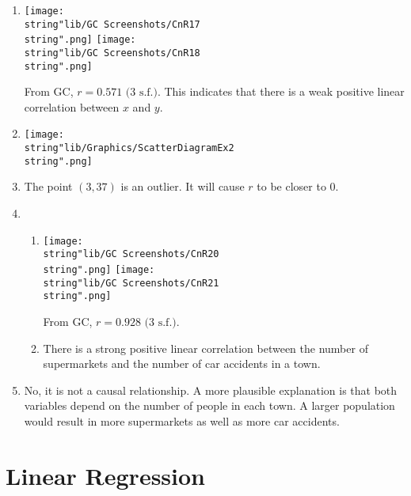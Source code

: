 \documentclass[11pt,a4paper]{book}
\begin{document}
\begin{example}
\Solution

\begin{enumerate}[label=(\alph*)]

\item  \texttt{[image: \\string"lib/GC Screenshots/CnR17\\string".png]}
\hspace{1cm}\texttt{[image: \\string"lib/GC Screenshots/CnR18\\string".png]}

From GC, $r=0.571\text{ (3 s.f.)}$. This indicates that there is
a weak positive linear correlation between $x$ and $y$.

\item  \texttt{[image: \\string"lib/Graphics/ScatterDiagramEx2\\string".png]}

\item  The point $\left(3,37\right)$ is an outlier. It will cause
$r$ to be closer to $0$.

\item  \begin{enumerate}[label=(\roman*)]

\item  \texttt{[image: \\string"lib/GC Screenshots/CnR20\\string".png]}
\hspace{1cm}\texttt{[image: \\string"lib/GC Screenshots/CnR21\\string".png]}

From GC, $r=0.928\text{ (3 s.f.)}$.

\item  There is a strong positive linear correlation between the
number of supermarkets and the number of car accidents in a town.

\end{enumerate}

\item  No, it is not a causal relationship. A more plausible explanation
is that both variables depend on the number of people in each town.
A larger population would result in more supermarkets as well as more
car accidents.

\end{enumerate}

\end{example}

\newpage

\section{Linear Regression}
\end{document}
